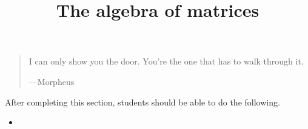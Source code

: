 \documentclass{ximera}
\title{The algebra of matrices}
\begin{document}
\begin{abstract}
\end{abstract}
\maketitle

\begin{quote}
  I can only show you the door. You're the one that has to walk through it.


  \hfill ---Morpheus
\end{quote}
After completing this section, students should be able to do the following.

\begin{itemize}
\item 
\end{itemize}
\end{document}
